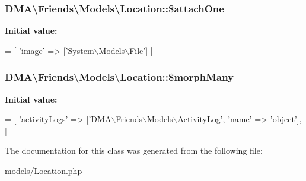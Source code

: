 \subsubsection[{\$attach\+One}]{\setlength{\rightskip}{0pt plus 5cm}D\+M\+A\textbackslash{}\+Friends\textbackslash{}\+Models\textbackslash{}\+Location\+::\$attach\+One}\label{classDMA_1_1Friends_1_1Models_1_1Location_a4565a1d2e52265bc6399d13dab84c8c9}
{\bfseries Initial value\+:}
\begin{DoxyCode}
= [
        \textcolor{stringliteral}{'image'} => [\textcolor{stringliteral}{'System\(\backslash\)Models\(\backslash\)File'}]
    ]
\end{DoxyCode}
\hypertarget{classDMA_1_1Friends_1_1Models_1_1Location_a94915d02afa4db52780159b84d9ce12e}{}
\subsubsection[{\$morph\+Many}]{\setlength{\rightskip}{0pt plus 5cm}D\+M\+A\textbackslash{}\+Friends\textbackslash{}\+Models\textbackslash{}\+Location\+::\$morph\+Many}\label{classDMA_1_1Friends_1_1Models_1_1Location_a94915d02afa4db52780159b84d9ce12e}
{\bfseries Initial value\+:}
\begin{DoxyCode}
= [ 
        \textcolor{stringliteral}{'activityLogs'}  => [\textcolor{stringliteral}{'DMA\(\backslash\)Friends\(\backslash\)Models\(\backslash\)ActivityLog'}, \textcolor{stringliteral}{'name'} => \textcolor{stringliteral}{'object'}],
    ]
\end{DoxyCode}


The documentation for this class was generated from the following file\+:\begin{DoxyCompactItemize}
\item 
models/Location.\+php\end{DoxyCompactItemize}
